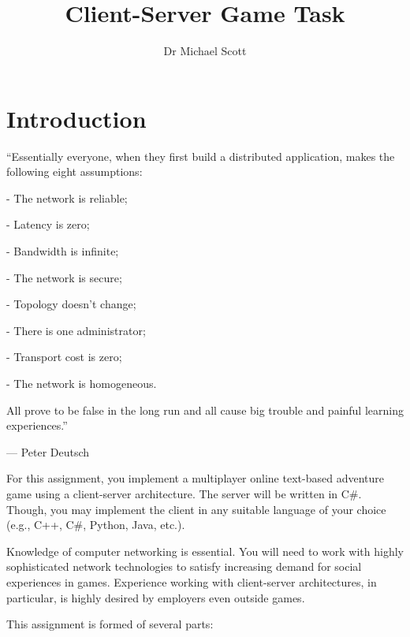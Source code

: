 \documentclass{../../fal_assignment}
\title{Client-Server Game Task}
\author{Dr Michael Scott}
\begin{document}
\maketitle

\section*{Introduction}

\begin{marginquote}
``Essentially everyone, when they first build a distributed application, makes the following eight assumptions:

\par - The network is reliable;
\par - Latency is zero;
\par - Bandwidth is infinite;
\par - The network is secure;
\par - Topology doesn't change;
\par - There is one administrator;
\par - Transport cost is zero;
\par - The network is homogeneous.

All prove to be false in the long run and all cause big trouble and painful learning experiences.''

\par --- Peter Deutsch
\end{marginquote}

For this assignment, you implement a multiplayer online text-based adventure game using a client-server architecture.  The server will be written in C\#. Though, you may implement the client in any suitable language of your choice (e.g., C++, C\#, Python, Java, etc.). 

Knowledge of computer networking is essential. You will need to work with highly sophisticated network technologies to satisfy increasing demand for social experiences in games. Experience working with client-server architectures, in particular, is highly desired by employers even outside games.

This assignment is formed of several parts:
\end{document}
